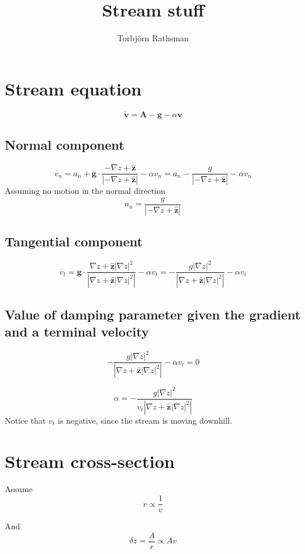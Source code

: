 \documentclass[a4paper, 11pt]{scrartcl}
\title{Stream stuff}
\author{Torbjörn Rathsman}
\renewcommand{\vec}[1]{\boldsymbol{#1}}
\newcommand{\grad}{\nabla}
\begin{document}
\maketitle


\section{Stream equation}
$$
\dot{\vec{v}} = \vec{A} - \vec{g} - \alpha\vec{v}
$$

\subsection{Normal component}
$$
 \dot{v_n} = a_n + \vec{g}\cdot\frac{-\grad z + \hat{\vec{z}}}{\left|-\grad z + \hat{\vec{z}}\right|} - \alpha v_n
           = a_n - \frac{g}{\left|-\grad z + \hat{\vec{z}}\right|} - \alpha v_n
$$
Assuming no motion in the normal direction
$$
a_n = \frac{g}{\left|-\grad z + \hat{\vec{z}}\right|}
$$

\subsection{Tangential component}
$$
\dot{v_t} = \vec{g}\cdot\frac{\grad z + \hat{\vec{z}}|\grad z|^2}{\left|\grad z + \hat{\vec{z}}|\grad z|^2 \right|} - \alpha v_t
 = -\frac{g|\grad z|^2}{\left|\grad z + \hat{\vec{z}}|\grad z|^2 \right|} - \alpha v_t
$$
\subsection{Value of damping parameter given the gradient and a terminal velocity}
$$
-\frac{g|\grad z|^2}{\left|\grad z + \hat{\vec{z}}|\grad z|^2 \right|} - \alpha v_t = 0
$$

$$
\alpha = -\frac{g|\grad z|^2}{v_t\left|\grad z + \hat{\vec{z}}|\grad z|^2 \right|}
$$
Notice that $v_t$ is negative, since the stream is moving downhill.

\section{Stream cross-section}
Assume
$$
r \propto \frac{1}{v}
$$

And
$$
\delta z = \frac{A}{r} \propto A v
$$
\end{document}
